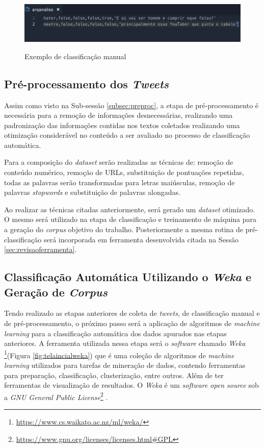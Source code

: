 \begin{figure}[!h]
\centering 
\caption{Exemplo de classificação manual }
\includegraphics[scale=0.60]{imagens/arqanalise.png}
\label{fig:arqanalise}
\end{figure}

\subsection{Pré-processamento dos \textit{Tweets}}
Assim como visto na Sub-sessão \ref{subsec:preproc}, a etapa de pré-processamento é necessária para a remoção de informações desnecessárias, realizando uma padronização das informações contidas nos textos coletados realizando uma otimização considerável no conteúdo a ser avaliado no processo de classificação automática. 

Para a composição do \textit{dataset} serão realizadas as técnicas de: remoção de conteúdo numérico, remoção de URLs, substituição de pontuações repetidas, todas as palavras serão transformadas para letras maiúsculas, remoção de palavras \textit{stopwords} e substituição de palavras alongadas. 

Ao realizar as técnicas citadas anteriormente, será gerado um \textit{dataset} otimizado. O mesmo será utilizado na etapa de classificação e treinamento de máquina para a geração do \textit{corpus} objetivo do trabalho. Posteriormente a mesma rotina de pré-classificação será incorporada em ferramenta desenvolvida citada na Sessão \ref{sec:revisaoferramenta}.

\subsection{Classificação Automática Utilizando o \textit{Weka} e Geração de \textit{Corpus}}

Tendo realizado as etapas anteriores de coleta de \textit{tweets}, de classificação manual e de pré-processamento, o próximo passo será a aplicação de algoritmos de \textit{machine learning} para a classificação automática dos dados apurados nas etapas anteriores. A ferramenta utilizada nessa etapa será o \textit{software} chamado \textit{Weka} \footnote{\url{https://www.cs.waikato.ac.nz/ml/weka/}}(Figura \ref{fig:telaincialweka}) que é uma coleção de algoritmos de \textit{machine learning} utilizados para tarefas de mineração de dados, contendo ferramentas para preparação, classificação, clusterização, entre outros.  Além de ter ferramentas de visualização de resultados. O \textit{Weka} é um \textit{software} \textit{open source} sob a \textit{GNU General Public License}\footnote{\url{https://www.gnu.org/licenses/licenses.html\#GPL}} \cite{weka_2018}.

